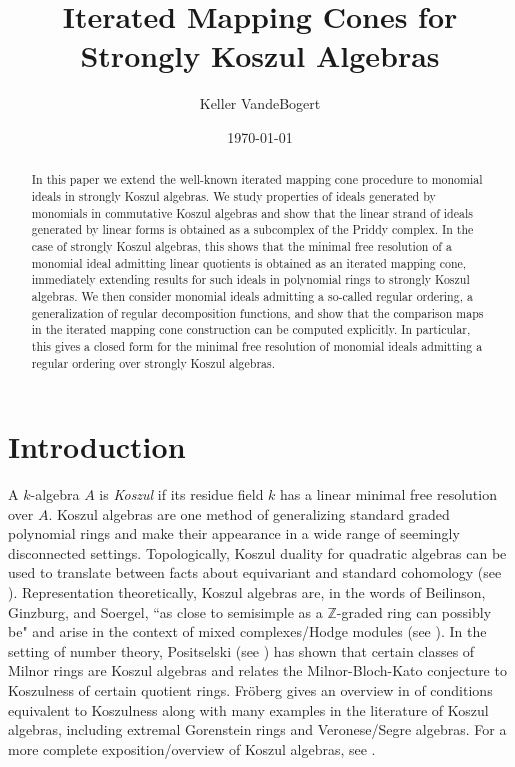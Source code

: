 \documentclass[10pt]{amsart}
\theoremstyle{definition}
\theoremstyle{remark}
\newtheorem{the context}[theorem]{The Context}
\numberwithin{equation}{theorem}
\numberwithin{equation}{section}
\newcommand{\bbz}{\mathbb{Z}}
\begin{document}
\title{Iterated Mapping Cones for Strongly Koszul Algebras}

\author{Keller VandeBogert}
\address{University of Notre Dame}
\date{\today}

\maketitle

\begin{abstract}
    In this paper we extend the well-known iterated mapping cone procedure to monomial ideals in strongly Koszul algebras. We study properties of ideals generated by monomials in commutative Koszul algebras and show that the linear strand of ideals generated by linear forms is obtained as a subcomplex of the Priddy complex. In the case of strongly Koszul algebras, this shows that the minimal free resolution of a monomial ideal admitting linear quotients is obtained as an iterated mapping cone, immediately extending results for such ideals in polynomial rings to strongly Koszul algebras. We then consider monomial ideals admitting a so-called regular ordering, a generalization of regular decomposition functions, and show that the comparison maps in the iterated mapping cone construction can be computed explicitly. In particular, this gives a closed form for the minimal free resolution of monomial ideals admitting a regular ordering over strongly Koszul algebras.
\end{abstract}

\section{Introduction}

A $k$-algebra $A$ is \emph{Koszul} if its residue field $k$ has a linear minimal free resolution over $A$. Koszul algebras are one method of generalizing standard graded polynomial rings and make their appearance in a wide range of seemingly disconnected settings. Topologically, Koszul duality for quadratic algebras can be used to translate between facts about equivariant and standard cohomology (see \cite{goresky1997equivariant}). Representation theoretically, Koszul algebras are, in the words of Beilinson, Ginzburg, and Soergel, ``as close to semisimple as a $\bbz$-graded ring can possibly be" and arise in the context of mixed complexes/Hodge modules (see \cite{beilinson1996koszul}). In the setting of number theory, Positselski (see \cite{positselski2014galois}) has shown that certain classes of Milnor rings are Koszul algebras and relates the Milnor-Bloch-Kato conjecture to Koszulness of certain quotient rings. Fr\"oberg gives an overview in \cite{froberg1999koszul} of conditions equivalent to Koszulness along with many examples in the literature of Koszul algebras, including extremal Gorenstein rings and Veronese/Segre algebras. For a more complete exposition/overview of Koszul algebras, see \cite{polishchuk2005quadratic}.
\end{document}
